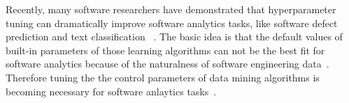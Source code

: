 





Recently, many software researchers have demonstrated that hyperparameter tuning can dramatically improve software analytics tasks, like software defect prediction and text classification ~\cite{agrawal2017better,AGRAWAL2018,Fu2016TuningFS,tanti18,xia2018hyperparameter, fu2017easy}. The basic idea is that the default values of built-in parameters of those learning algorithms can not be the best fit for software analytics because of the naturalness of software engineering data~\cite{fu2016differential, hindle2012naturalness}. Therefore tuning the the control parameters of data
mining algorithms is becoming necessary for software anlaytics tasks~\cite{Fu2016TuningFS,tanti18}.


